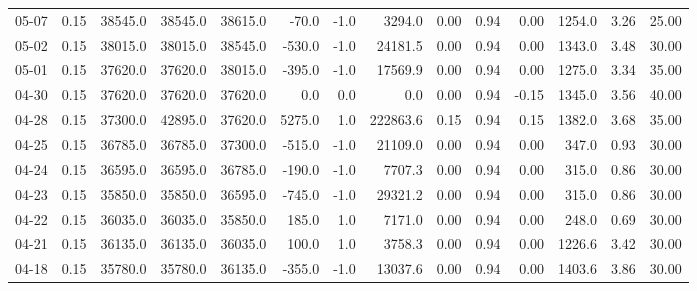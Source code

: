 \begin{threeparttable}
{\begin{tabular}{lrrrrrrrrrrrrr}
  05-07 &     0.15 & 38545.0 & 38545.0 & 38615.0 &      -70.0 &                     -1.0 &              3294.0 &       0.00 &      0.94 &           0.00 &           1254.0 &            3.26 &                  25.00 \\
  05-02 &     0.15 & 38015.0 & 38015.0 & 38545.0 &     -530.0 &                     -1.0 &             24181.5 &       0.00 &      0.94 &           0.00 &           1343.0 &            3.48 &                  30.00 \\
  05-01 &     0.15 & 37620.0 & 37620.0 & 38015.0 &     -395.0 &                     -1.0 &             17569.9 &       0.00 &      0.94 &           0.00 &           1275.0 &            3.34 &                  35.00 \\
  04-30 &     0.15 & 37620.0 & 37620.0 & 37620.0 &        0.0 &                      0.0 &                 0.0 &       0.00 &      0.94 &          -0.15 &           1345.0 &            3.56 &                  40.00 \\
  04-28 &     0.15 & 37300.0 & 42895.0 & 37620.0 &     5275.0 &                      1.0 &            222863.6 &       0.15 &      0.94 &           0.15 &           1382.0 &            3.68 &                  35.00 \\
  04-25 &     0.15 & 36785.0 & 36785.0 & 37300.0 &     -515.0 &                     -1.0 &             21109.0 &       0.00 &      0.94 &           0.00 &            347.0 &            0.93 &                  30.00 \\
  04-24 &     0.15 & 36595.0 & 36595.0 & 36785.0 &     -190.0 &                     -1.0 &              7707.3 &       0.00 &      0.94 &           0.00 &            315.0 &            0.86 &                  30.00 \\
  04-23 &     0.15 & 35850.0 & 35850.0 & 36595.0 &     -745.0 &                     -1.0 &             29321.2 &       0.00 &      0.94 &           0.00 &            315.0 &            0.86 &                  30.00 \\
  04-22 &     0.15 & 36035.0 & 36035.0 & 35850.0 &      185.0 &                      1.0 &              7171.0 &       0.00 &      0.94 &           0.00 &            248.0 &            0.69 &                  30.00 \\
  04-21 &     0.15 & 36135.0 & 36135.0 & 36035.0 &      100.0 &                      1.0 &              3758.3 &       0.00 &      0.94 &           0.00 &           1226.6 &            3.42 &                  30.00 \\
  04-18 &     0.15 & 35780.0 & 35780.0 & 36135.0 &     -355.0 &                     -1.0 &             13037.6 &       0.00 &      0.94 &           0.00 &           1403.6 &            3.86 &                  30.00 \\

\end{tabular}}
\end{threeparttable}
